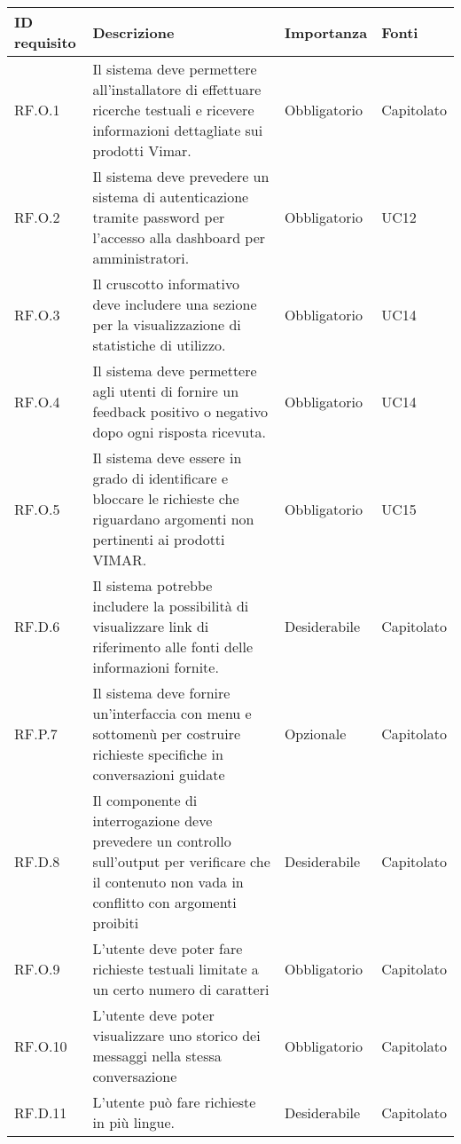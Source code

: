 

\begin{longtable}{|C{2.7cm}|L{7.2cm}|C{2.7cm}|C{2cm}|}
        \hline
        \textbf{ID requisito} & \textbf{Descrizione} & \textbf{Importanza} & \textbf{Fonti}  \\
        \hline
        RF.O.1 & Il sistema deve permettere all'installatore di effettuare ricerche testuali e ricevere informazioni dettagliate sui prodotti Vimar. & Obbligatorio & Capitolato \\
        \hline
        RF.O.2 & Il sistema deve prevedere un sistema di autenticazione tramite password per l'accesso alla dashboard per amministratori. & Obbligatorio & UC12 \\
        \hline
        RF.O.3 & Il cruscotto informativo deve includere una sezione per la visualizzazione di statistiche di utilizzo. & Obbligatorio & UC14 \\
        \hline
        RF.O.4 & Il sistema deve permettere agli utenti di fornire un feedback positivo o negativo dopo ogni risposta ricevuta. & Obbligatorio & UC14 \\
        \hline
        RF.O.5 & Il sistema deve essere in grado di identificare e bloccare le richieste che riguardano argomenti non pertinenti ai prodotti VIMAR. & Obbligatorio & UC15 \\
        \hline
        RF.D.6 & Il sistema potrebbe includere la possibilità di visualizzare link di riferimento alle fonti delle informazioni fornite. & Desiderabile & Capitolato \\
        \hline
        RF.P.7 & Il sistema deve fornire un'interfaccia con menu e sottomenù per costruire richieste specifiche in conversazioni guidate & Opzionale & Capitolato\\
        \hline
        RF.D.8 & Il componente di interrogazione deve prevedere un controllo sull’output
        per verificare che il contenuto non vada in conflitto con argomenti proibiti & Desiderabile & Capitolato \\
        \hline
        RF.O.9 & L’utente deve poter fare richieste testuali limitate a un certo numero di caratteri & Obbligatorio & Capitolato \\
        \hline
        RF.O.10 & L’utente deve poter visualizzare uno storico dei messaggi nella stessa
        conversazione & Obbligatorio & Capitolato \\
        \hline
        RF.D.11 & L’utente può fare richieste in più lingue.
         & Desiderabile & Capitolato \\

\end{longtable}
